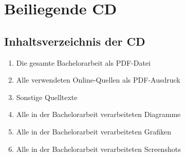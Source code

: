 
\section{Beiliegende CD}
\label{sec:BeiliegendeCd}

\subsection{Inhaltsverzeichnis der CD}
\label{subsec:InhaltsverzeichnisCd}

\begin{enumerate}
	\item Die gesamte Bachelorarbeit als PDF-Datei
	\item Alle verwendeten Online-Quellen als PDF-Ausdruck
	\item Sonstige Quelltexte
	\item Alle in der Bachelorarbeit verarbeiteten Diagramme
	\item Alle in der Bachelorarbeit verarbeiteten Grafiken
	\item Alle in der Bachelorarbeit verarbeiteten Screenshots
\end{enumerate}